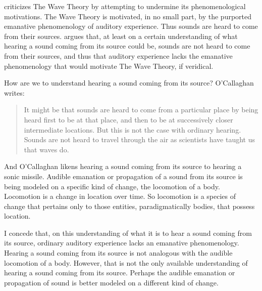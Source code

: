 \citet[chapter 3.4]{OCallaghan:2007xy} criticizes The Wave Theory by attempting to undermine its phenomenological motivations. The Wave Theory is motivated, in no small part, by the purported emanative phenomenology of auditory experience. Thus sounds are heard to come from their sources. \citet{OCallaghan:2007xy,OCallaghan:2009aa} argues that, at least on a certain understanding of what hearing a sound coming from its source could be, sounds are not heard to come from their sources, and thus that auditory experience lacks the emanative phenomenology that would motivate The Wave Theory, if veridical.

How are we to understand hearing a sound coming from its source? O'Callaghan writes:
\begin{quote}
	It might be that sounds are heard to come from a particular place by being heard first to be at that place, and then to be at successively closer intermediate locations. But this is not the case with ordinary hearing. Sounds are not heard to travel through the air as scientists have taught us that waves do. \citep[34]{OCallaghan:2007xy}
\end{quote}
And O'Callaghan likens hearing a sound coming from its source to hearing a sonic missile. Audible emanation or propagation of a sound from its source is being modeled on a specific kind of change, the locomotion of a body. Locomotion is a change in location over time. So locomotion is a species of change that pertains only to those entities, paradigmatically bodies, that possess location. 

I concede that, on this understanding of what it is to hear a sound coming from its source, ordinary auditory experience lacks an emanative phenomenology. Hearing a sound coming from its source is not analogous with the audible locomotion of a body. However, that is not the only available understanding of hearing a sound coming from its source. Perhaps the audible emanation or propagation of sound is better modeled on a different kind of change. 

